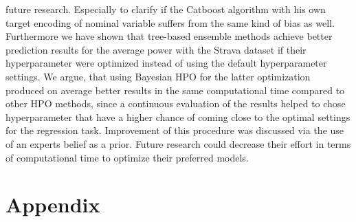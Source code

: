 \documentclass[12pt,a4paper]{article}
\begin{document}
future research. Especially to clarify if the Catboost algorithm with his own target encoding of nominal variable suffers from the same kind of bias as well. Furthermore we have shown that tree-based ensemble methods achieve better prediction results for the average power with the Strava dataset if their hyperparameter were optimized instead of using the default hyperparameter settings. We argue, that using Bayesian HPO for the latter optimization produced on average better results in the same computational time compared to other HPO methods, since a continuous evaluation of the results helped to chose hyperparameter that have a higher chance of coming close to the optimal settings for the regression task. Improvement of this procedure was discussed via the use of an experts belief as a prior. Future research could decrease their effort in terms of computational time to optimize their preferred models.

\printbibliography

\pagebreak

\appendix

\hypertarget{appendix}{%
\section{\texorpdfstring{Appendix \label{sec:appendix}}{Appendix }}\label{appendix}}
\end{document}

